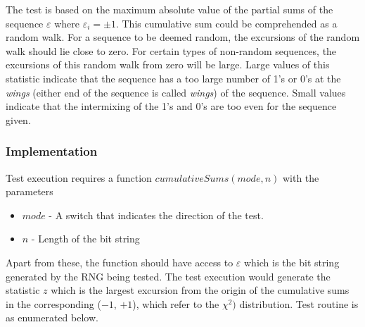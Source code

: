 The test is based on the maximum absolute value of the partial sums of the sequence $\varepsilon$ where $\varepsilon_i=\pm1$. This cumulative sum could be comprehended as a random walk. For a sequence to be deemed random, the excursions of the random walk should lie close to zero. For certain types of non-random sequences, the excursions of this random walk from zero will be large. Large values of this statistic indicate that the sequence has a too large number of 1's or 0's at the \textit{wings} (either end of the sequence is called \textit{wings}) of the sequence. Small values indicate that the intermixing of the 1's and 0's are too even for the sequence given.

\subsubsection{Implementation}

Test execution requires a function $cumulativeSums(mode,n)$ with the parameters

\begin{itemize}
    \item $mode$ - A switch that indicates the direction of the test.
    \item $n$ - Length of the bit string
\end{itemize}

Apart from these, the function should have access to $\varepsilon$ which is the bit string generated by the RNG being tested. The test execution would generate the statistic $z$ which is the largest excursion from the origin of the cumulative sums in the corresponding ($-1$, $+1$), which refer to the $\chi^2)$ distribution. Test routine is as enumerated below.

